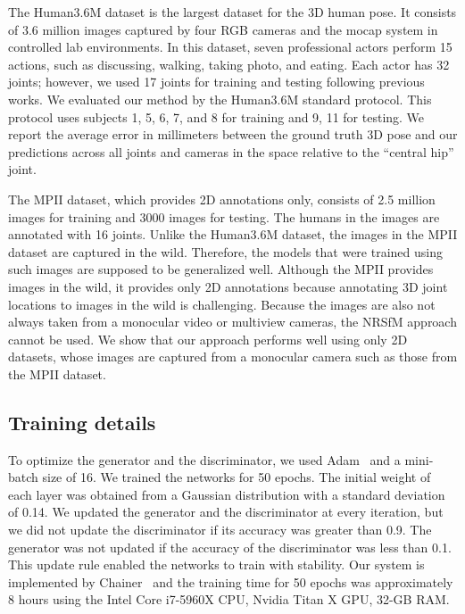 \documentclass[runningheads]{llncs}
\newcommand{\matsui}[1]{\textbf{\textcolor{cyan}{[\textsc{MATSUI:} #1]}}}
\begin{document}
The Human3.6M dataset is the largest dataset for the 3D human pose. It consists of 3.6 million images captured by four RGB cameras and the mocap system in controlled lab environments.
In this dataset, seven professional actors perform 15 actions, such as discussing, walking, taking photo, and eating.
Each actor has 32 joints; however, we used 17 joints for training and testing following previous works.
We evaluated our method by the Human3.6M standard protocol.
This protocol uses subjects 1, 5, 6, 7, and 8 for training and 9, 11 for testing.
We report the average error in millimeters between the ground truth 3D pose and our predictions across all joints and cameras in the space relative to the ``central hip'' joint.

The MPII dataset, which provides 2D annotations only, consists of 2.5 million images for training and 3000 images for testing.
The humans in the images are annotated with 16 joints.
Unlike the Human3.6M dataset, the images in the MPII dataset are captured in the wild.
Therefore, the models that were trained using such images are supposed to be generalized well.
Although the MPII provides images in the wild, it provides only 2D annotations because annotating 3D joint locations to images in the wild is challenging.
Because the images are also not always taken from a monocular video or multiview cameras, the NRSfM approach cannot be used.
We show that our approach performs well using only 2D datasets, whose images are captured from a monocular camera such as those from the MPII dataset.

\subsection{Training details}
To optimize the generator and the discriminator, we used Adam~\cite{adam} and a mini-batch size of 16.
We trained the networks for 50 epochs.
The initial weight of each layer was obtained from a Gaussian distribution with a standard deviation of 0.14.
We updated the generator and the discriminator at every iteration, but we did not update the discriminator if its accuracy was greater than 0.9.
The generator was not updated if the accuracy of the discriminator was less than 0.1.
This update rule enabled the networks to train with stability.
Our system is implemented by Chainer~\cite{chainer} and the training time for 50 epochs was approximately 8 hours using the Intel Core i7-5960X CPU, Nvidia Titan X GPU, 32-GB RAM.
\end{document}
